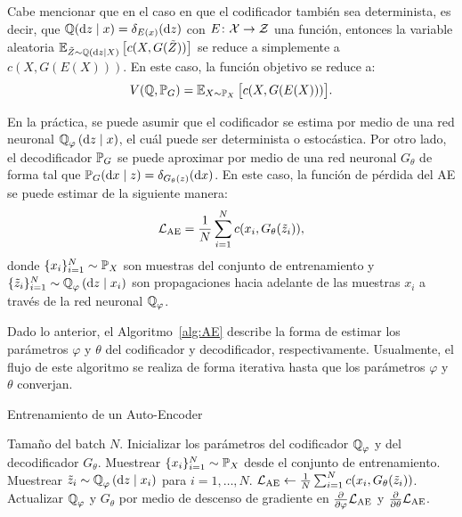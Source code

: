 Cabe mencionar que en el caso en que el codificador también sea determinista, es decir, que $\ProbQ(\dz \mid x) = \delta_{E(x)}(\dz)$ con $E\colon \mathcal{X} \to \mathcal{Z}$ una función, entonces la variable aleatoria
$\Exp_{\tilde Z \sim \ProbQ(\dz \mid X)} \qty\big[ c(X, G(\tilde Z)) ]$ se reduce a simplemente a $c(X, G(E(X)))$. En este caso, la función objetivo se reduce a:
\begin{equation}\label{eq:ae-obj-func-deterministic}
    V(\ProbQ, \Prob_G) = \Exp_{X \sim \Prob_X} \qty\big[ c(X, G(E(X))) ].
\end{equation}

En la práctica, se puede asumir que el codificador se estima por medio de una red neuronal $\ProbQ_\varphi \left( \dd z \mid x \right)$, el cuál puede ser determinista o estocástica. Por otro lado, el decodificador $\Prob_G$ se puede aproximar por medio de una red neuronal $G_\theta$ de forma tal que $\Prob_G(\dd x \mid z) = \delta_{G_\theta(z)}(\dd x)$.
En este caso, la función de pérdida del AE se puede estimar de la siguiente manera:
\begin{equation}
    \mathcal{L}_{\mathrm{AE}} = \frac{1}{N}\sum_{i=1}^{N} c(x_i, G_\theta(\tilde z_i)),
\end{equation}
donde $\{x_i\}_{i=1}^{N} \sim \Prob_X$ son muestras del conjunto de entrenamiento y $\{\tilde z_i\}_{i=1}^{N} \sim \ProbQ_\varphi \left( \dd z \mid x_i \right)$ son propagaciones hacia adelante de las muestras $x_i$ a través de la red neuronal $\ProbQ_\varphi$.

Dado lo anterior, el Algoritmo~\ref{alg:AE} describe la forma de estimar los parámetros $\varphi$ y $\theta$ del codificador y decodificador, respectivamente. Usualmente, el flujo de este algoritmo se realiza de forma iterativa hasta que los parámetros $\varphi$ y $\theta$ converjan.

\begin{algorithm}[H]
    \caption{Entrenamiento de un Auto-Encoder}\label{alg:AE}
    \begin{algorithmic}[1]
        \Require Tamaño del batch $N$.
        \State Inicializar los parámetros del codificador $\ProbQ_\varphi$ y del decodificador $G_\theta$.
        \State Muestrear $\{x_i\}_{i=1}^{N} \sim \Prob_X$ desde el conjunto de entrenamiento.
        \State Muestrear $\tilde z_i \sim \ProbQ_\varphi \left( \dd z \mid x_i \right)$ para $i=1,\ldots,N$.
        \State $\mathcal{L}_{\mathrm{AE}}\gets \frac{1}{N}\sum_{i=1}^{N} c(x_i, G_\theta(\tilde z_i))$.
        \State Actualizar $\ProbQ_\varphi$ y $G_\theta$ por medio de descenso de gradiente en $\pdv{\varphi} \cL_{\mathrm{AE}}$ y $\pdv{\theta} \mathcal{L}_{\mathrm{AE}}$.
        \EndWhile
    \end{algorithmic}

\end{algorithm}


